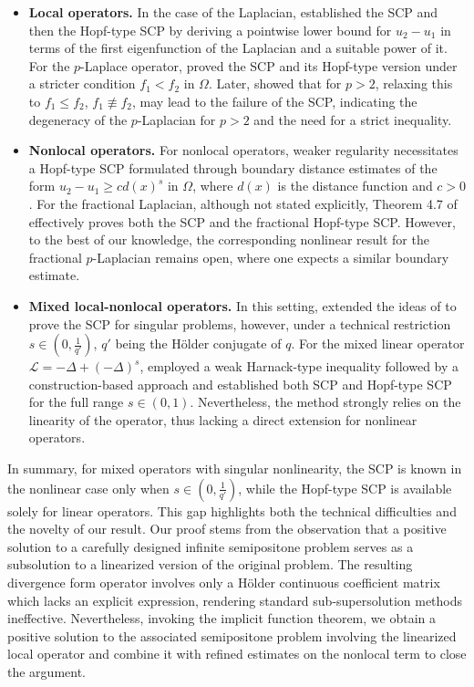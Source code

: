 \documentclass[reqno,oneside]{amsart}
\theoremstyle{definition}
\theoremstyle{remark}
\numberwithin{equation}{section}
\newcommand{\Om} {\Omega}
\newcommand{\De} {\Delta}
\begin{document}
\begin{itemize}
    \item \textbf{Local operators.} In the case of the Laplacian,\cite{dhanya2015three} established the SCP and then the Hopf-type SCP by deriving a pointwise lower bound for $u_2-u_1$ in terms of the first eigenfunction of the Laplacian and a suitable power of it. For the $p$-Laplace operator, \cite{giacomoni2007sobolev} proved the SCP and its Hopf-type version under a stricter condition $f_1 < f_2$ in $\Om.$ Later, \cite{indulekha2023scp} showed that for $p>2$, relaxing this to $f_1 \leq f_2$, $f_1 \not\equiv f_2$, may lead to the failure of the SCP, indicating the degeneracy of the $p$-Laplacian for $p>2$ and the need for a strict inequality.

    \item \textbf{Nonlocal operators.} For nonlocal operators, weaker regularity necessitates a Hopf-type SCP formulated through boundary distance estimates of the form $u_2-u_1 \geq c d(x)^s$ in $\Om$, where $d(x)$ is the distance function and $c>0$. For the fractional Laplacian, although not stated explicitly, Theorem 4.7 of \cite{giacomoni2019existence} effectively proves both the SCP and the fractional Hopf-type SCP. However, to the best of our knowledge, the corresponding nonlinear result for the fractional $p$-Laplacian remains open, where one expects a similar boundary estimate.

    \item \textbf{Mixed local-nonlocal operators.} In this setting, \cite{dhanya2026regularity} extended the ideas of \cite{jarohs2018strong} to prove the SCP for singular problems, however, under a technical restriction $s\in \left(0, \frac{1}{q'} \right)$, $q'$ being the H\"older conjugate of $q$. For the mixed linear operator $\mathcal{L} = -\De + (-\De)^s$, \cite{pramanik2024mixed} employed a weak Harnack-type inequality followed by a construction-based approach and established both SCP and Hopf-type SCP for the full range $s\in(0,1)$. Nevertheless, the method strongly relies on the linearity of the operator, thus lacking a direct extension for nonlinear operators.
\end{itemize}

In summary, for mixed operators with singular nonlinearity, the SCP is known in the nonlinear case only when $s\in \left(0, \frac{1}{q'} \right)$, while the Hopf-type SCP is available solely for linear operators. This gap highlights both the technical difficulties and the novelty of our result. Our proof stems from the observation that a positive solution to a carefully designed infinite semipositone problem serves as a subsolution to a linearized version of the original problem. The resulting divergence form operator involves only a H\"older continuous coefficient matrix which lacks an explicit expression, rendering standard sub-supersolution methods ineffective. Nevertheless, invoking the implicit function theorem, we obtain a positive solution to the associated semipositone problem involving the linearized local operator and combine it with refined estimates on the nonlocal term to close the argument.
\end{document}
